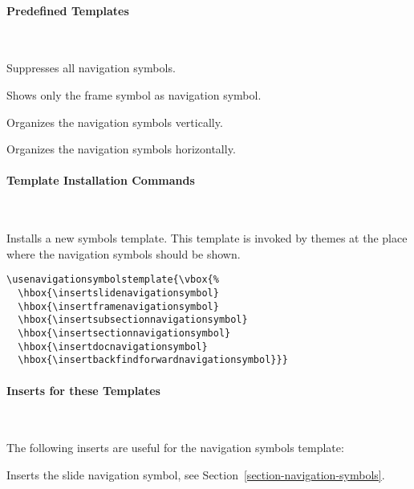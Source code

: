 \paragraph{Predefined Templates}\ 

\begin{command}{\beamertemplatenavigationsymbolsempty}
  Suppresses all navigation symbols.
\end{command}

\begin{command}{\beamertemplatenavigationsymbolsframe}
  Shows only the frame symbol as navigation symbol.
\end{command}

\begin{command}{\beamertemplatenavigationsymbolsvertical}
  Organizes the navigation symbols vertically.
\end{command}

\begin{command}{\beamertemplatenavigationsymbolshorizontal}
  Organizes the navigation symbols horizontally.
\end{command}



\paragraph{Template Installation Commands}\ 

\begin{command}{\usenavigationsymbolstemplate{}}
  Installs a new symbols template. This template is invoked by themes
  at the place where the navigation symbols should be shown.
  \example
\begin{verbatim}
\usenavigationsymbolstemplate{\vbox{%
  \hbox{\insertslidenavigationsymbol}
  \hbox{\insertframenavigationsymbol}
  \hbox{\insertsubsectionnavigationsymbol}
  \hbox{\insertsectionnavigationsymbol}
  \hbox{\insertdocnavigationsymbol}
  \hbox{\insertbackfindforwardnavigationsymbol}}}
\end{verbatim}
\end{command}


\paragraph{Inserts for these Templates}\ 

The following inserts are useful for the navigation symbols template:

\begin{command}{\insertslidenavigationsymbol}
  Inserts the slide navigation symbol, see
  Section~\ref{section-navigation-symbols}.
\end{command}


